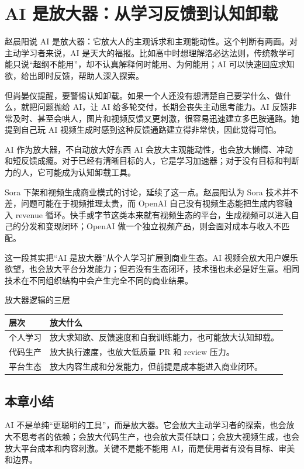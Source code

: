 \section{AI 是放大器：从学习反馈到认知卸载}

赵晨阳说 AI 是放大器：它放大人的主观诉求和主观能动性。这个判断有两面。对主动学习者来说，AI 是天大的福报。比如高中时想理解洛必达法则，传统教学可能只说“超纲不能用”，却不认真解释何时能用、为何能用；AI 可以快速回应求知欲，给出即时反馈，帮助人深入探索。

但尚晏仪提醒，要警惕认知卸载。如果一个人还没有想清楚自己要学什么、做什么，就把问题抛给 AI，让 AI 给多轮交付，长期会丧失主动思考能力。AI 反馈非常及时、甚至会哄人，图片和视频反馈又更刺激，很容易迅速建立多巴胺通路。她提到自己玩 AI 视频生成时感到这种反馈通路建立得非常快，因此觉得可怕。

\begin{warningbox}{AI 作为放大器，不自动放大好东西}
AI 会放大主观能动性，也会放大懒惰、冲动和短反馈成瘾。对于已经有清晰目标的人，它是学习加速器；对于没有目标和判断力的人，它可能成为认知卸载工具。
\end{warningbox}

Sora 下架和视频生成商业模式的讨论，延续了这一点。赵晨阳认为 Sora 技术并不差，问题可能在于视频推理太贵，而 OpenAI 自己没有视频生态能把生成内容融入 revenue 循环。快手或字节这类本来就有视频生态的平台，生成视频可以进入自己的分发和变现闭环；OpenAI 做一个独立视频产品，则会面对成本与收入不匹配。

这一段其实把“AI 是放大器”从个人学习扩展到商业生态。AI 视频会放大用户娱乐欲望，也会放大平台分发能力；但若没有生态闭环，技术强也未必是好生意。相同技术在不同组织结构中会产生完全不同的商业结果。

\begin{knowledgebox}{放大器逻辑的三层}
\begin{tabularx}{\textwidth}{>{\raggedright\arraybackslash}p{} Y}
\toprule
层次 & 放大什么 \\
\midrule
个人学习 & 放大求知欲、反馈速度和自我训练能力，也可能放大认知卸载。 \\
代码生产 & 放大执行速度，也放大低质量 PR 和 review 压力。 \\
平台生态 & 放大内容生成和分发能力，但前提是成本能进入商业闭环。 \\
\bottomrule
\end{tabularx}
\end{knowledgebox}

\subsection{本章小结}

AI 不是单纯“更聪明的工具”，而是放大器。它会放大主动学习者的探索，也会放大不思考者的依赖；会放大代码生产，也会放大责任缺口；会放大视频生成，也会放大平台成本和内容刺激。关键不是能不能用 AI，而是使用者有没有目标、审美和边界。

